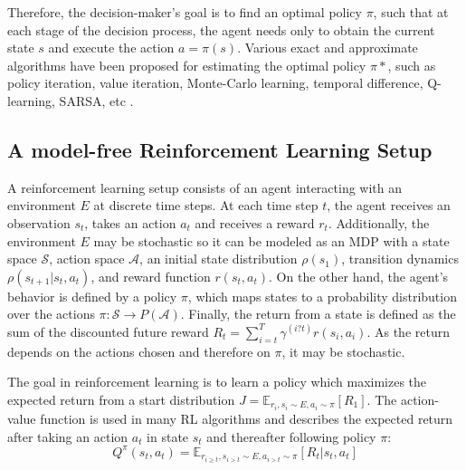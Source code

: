 Therefore, the decision-maker's goal is to find an optimal policy $\pi$, such that at each stage of the decision process, the agent needs only to obtain the current state $s$ and execute the action $a=\pi(s)$. Various exact and approximate algorithms have been proposed for estimating the optimal policy $\pi*$, such as policy iteration, value iteration, Monte-Carlo learning, temporal difference, Q-learning, SARSA, etc \cite{kaelbling1996reinforcement}\cite{sutton1998reinforcement}.

\subsection{A model-free Reinforcement Learning Setup}
\label{sec:model-free}

A reinforcement learning setup consists of an agent interacting with an environment $E$ at discrete time steps. At each time step $t$, the agent receives an observation $s_t$, takes an action $a_t$ and receives a reward $r_t$. Additionally, the environment $E$ may be stochastic so it can be modeled as an MDP with a state space $\mathcal{S}$, action space $\mathcal{A}$, an initial state distribution $\rho(s_1)$, transition dynamics $\rho(s_{t+1}|s_t, a_t)$, and reward function $r(s_t, a_t)$. On the other hand, the agent's behavior is defined by a policy $\pi$, which maps states to a probability distribution over the actions $\pi : \mathcal{S} \rightarrow P(\mathcal{A})$. Finally, the return from a state is defined as the sum of the discounted future reward $R_t = \sum^T_{i=t} \gamma^{(i?t)}r(s_i, a_i)$. As the return depends on the actions chosen and therefore on $\pi$, it may be stochastic. 

The goal in reinforcement learning is to learn a policy which maximizes the expected return from a start distribution $J = \mathbb{E}_{r_i,s_i \sim E,a_i \sim \pi}[R_1]$. The action-value function is used in many RL algorithms and describes the expected return after taking an action $a_t$ in state $s_t$ and thereafter following policy $\pi$:
\begin{equation}
\label{eq:action-valueFcn}
Q^{\pi}(s_t, a_t) = \mathbb{E}_{r_{i \geq t}, s_{i > t} \sim E, a_{i > t} \sim \pi} [R_t| s_t, a_t]
\end{equation}

